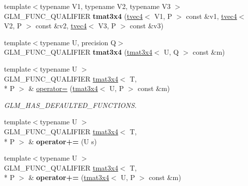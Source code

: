\begin{DoxyCompactItemize}
\item 
\hypertarget{structglm_1_1tmat3x4_a9388a3a74c10e23d0fd00611b04d1fd0}{{\footnotesize template$<$typename V1, typename V2, typename V3 $>$ }\\G\-L\-M\-\_\-\-F\-U\-N\-C\-\_\-\-Q\-U\-A\-L\-I\-F\-I\-E\-R {\bfseries tmat3x4} (\hyperlink{structglm_1_1tvec4}{tvec4}$<$ V1, P $>$ const \&v1, \hyperlink{structglm_1_1tvec4}{tvec4}$<$ V2, P $>$ const \&v2, \hyperlink{structglm_1_1tvec4}{tvec4}$<$ V3, P $>$ const \&v3)}\label{structglm_1_1tmat3x4_a9388a3a74c10e23d0fd00611b04d1fd0}

\item 
\hypertarget{structglm_1_1tmat3x4_a1117842438c01204536f3829257eaa12}{{\footnotesize template$<$typename U, precision Q$>$ }\\G\-L\-M\-\_\-\-F\-U\-N\-C\-\_\-\-Q\-U\-A\-L\-I\-F\-I\-E\-R {\bfseries tmat3x4} (\hyperlink{structglm_1_1tmat3x4}{tmat3x4}$<$ U, Q $>$ const \&m)}\label{structglm_1_1tmat3x4_a1117842438c01204536f3829257eaa12}

\item 
\hypertarget{structglm_1_1tmat3x4_a819a25fbfbbf505d7304adec59824063}{{\footnotesize template$<$typename U $>$ }\\G\-L\-M\-\_\-\-F\-U\-N\-C\-\_\-\-Q\-U\-A\-L\-I\-F\-I\-E\-R \hyperlink{structglm_1_1tmat3x4}{tmat3x4}$<$ T, \\*
P $>$ \& \hyperlink{structglm_1_1tmat3x4_a819a25fbfbbf505d7304adec59824063}{operator=} (\hyperlink{structglm_1_1tmat3x4}{tmat3x4}$<$ U, P $>$ const \&m)}\label{structglm_1_1tmat3x4_a819a25fbfbbf505d7304adec59824063}

\begin{DoxyCompactList}\small\item\em G\-L\-M\-\_\-\-H\-A\-S\-\_\-\-D\-E\-F\-A\-U\-L\-T\-E\-D\-\_\-\-F\-U\-N\-C\-T\-I\-O\-N\-S. \end{DoxyCompactList}\item 
\hypertarget{structglm_1_1tmat3x4_a1a06efd807d1d694d6c3d6c25227f6f5}{{\footnotesize template$<$typename U $>$ }\\G\-L\-M\-\_\-\-F\-U\-N\-C\-\_\-\-Q\-U\-A\-L\-I\-F\-I\-E\-R \hyperlink{structglm_1_1tmat3x4}{tmat3x4}$<$ T, \\*
P $>$ \& {\bfseries operator+=} (U s)}\label{structglm_1_1tmat3x4_a1a06efd807d1d694d6c3d6c25227f6f5}

\item 
\hypertarget{structglm_1_1tmat3x4_a67a241cb6158b5d52e8530ed74ed99cd}{{\footnotesize template$<$typename U $>$ }\\G\-L\-M\-\_\-\-F\-U\-N\-C\-\_\-\-Q\-U\-A\-L\-I\-F\-I\-E\-R \hyperlink{structglm_1_1tmat3x4}{tmat3x4}$<$ T, \\*
P $>$ \& {\bfseries operator+=} (\hyperlink{structglm_1_1tmat3x4}{tmat3x4}$<$ U, P $>$ const \&m)}\label{structglm_1_1tmat3x4_a67a241cb6158b5d52e8530ed74ed99cd}


\end{DoxyCompactItemize}
